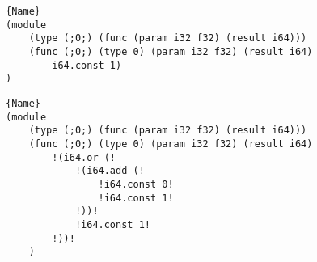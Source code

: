 


   \begin{minipage}[b]{\linewidth}
    \lstset{
        language=WAT,
                        style=watcode,
        basicstyle=\footnotesize\ttfamily,
                        columns=fullflexible,
                        breaklines=true}
        
        \begin{lstlisting}[label=example:peeporig,caption={Wasm function.},frame=b, captionpos=b]{Name}
(module
    (type (;0;) (func (param i32 f32) (result i64)))
    (func (;0;) (type 0) (param i32 f32) (result i64)
        i64.const 1)
)
        \end{lstlisting}
\end{minipage}


\begin{minipage}[b]{\linewidth}
    \lstset{
        language=WAT,
                        style=watcode,
        basicstyle=\footnotesize\ttfamily,
                        columns=fullflexible,
                        breaklines=true}
        
        \begin{lstlisting}[label=example:peepapplied,caption={Random peephole mutation using egraph traversal for \autoref{example:peeporig} over e-graph \autoref{e-graph3}. The textual format is folded for better understanding.},frame=b, captionpos=b]{Name}
(module
    (type (;0;) (func (param i32 f32) (result i64)))
    (func (;0;) (type 0) (param i32 f32) (result i64)
        !(i64.or (!
            !(i64.add (!
                !i64.const 0!
                !i64.const 1!
            !))!
            !i64.const 1!
        !))!
    )
        \end{lstlisting}
\end{minipage}
